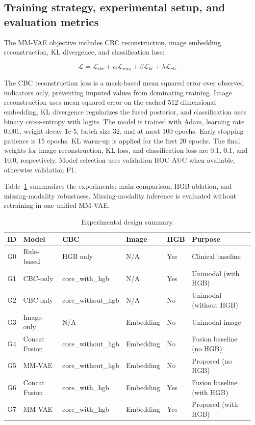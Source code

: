\documentclass[conference]{IEEEtran}
\begin{document}
\subsection{Training strategy, experimental setup, and evaluation metrics}

The MM-VAE objective includes CBC reconstruction, image embedding reconstruction, KL divergence, and classification loss:

\begin{equation}
\mathcal{L}=\mathcal{L}_{cbc}+\alpha\mathcal{L}_{img}+\beta\mathcal{L}_{kl}+\lambda\mathcal{L}_{cls}
\label{eq:loss}
\end{equation}

The CBC reconstruction loss is a mask-based mean squared error over observed indicators only, preventing imputed values from dominating training. Image reconstruction uses mean squared error on the cached 512-dimensional embedding, KL divergence regularizes the fused posterior, and classification uses binary cross-entropy with logits. The model is trained with Adam, learning rate 0.001, weight decay 1e-5, batch size 32, and at most 100 epochs. Early stopping patience is 15 epochs. KL warm-up is applied for the first 20 epochs. The final weights for image reconstruction, KL loss, and classification loss are 0.1, 0.1, and 10.0, respectively. Model selection uses validation ROC-AUC when available, otherwise validation F1.

Table~\ref{tab:experiment-design} summarizes the experiments: main comparison, HGB ablation, and missing-modality robustness. Missing-modality inference is evaluated without retraining in one unified MM-VAE.

\begin{table}[t]
\caption{Experimental design summary.}
\label{tab:experiment-design}
\centering
\small
\begin{tabular}{p{}p{}p{}p{}p{}p{}}
\hline
\textbf{ID} & \textbf{Model} & \textbf{CBC} & \textbf{Image} & \textbf{HGB} & \textbf{Purpose} \\
\hline
G0 & Rule-based & HGB only & N/A & Yes & Clinical baseline \\
G1 & CBC-only & core\_with\_hgb & N/A & Yes & Unimodal (with HGB) \\
G2 & CBC-only & core\_without\_hgb & N/A & No & Unimodal (without HGB) \\
G3 & Image-only & N/A & Embedding & No & Unimodal image \\
G4 & Concat Fusion & core\_without\_hgb & Embedding & No & Fusion baseline (no HGB) \\
G5 & MM-VAE & core\_without\_hgb & Embedding & No & Proposed (no HGB) \\
G6 & Concat Fusion & core\_with\_hgb & Embedding & Yes & Fusion baseline (with HGB) \\
G7 & MM-VAE & core\_with\_hgb & Embedding & Yes & Proposed (with HGB) \\
\hline
\end{tabular}
\end{table}
\end{document}
